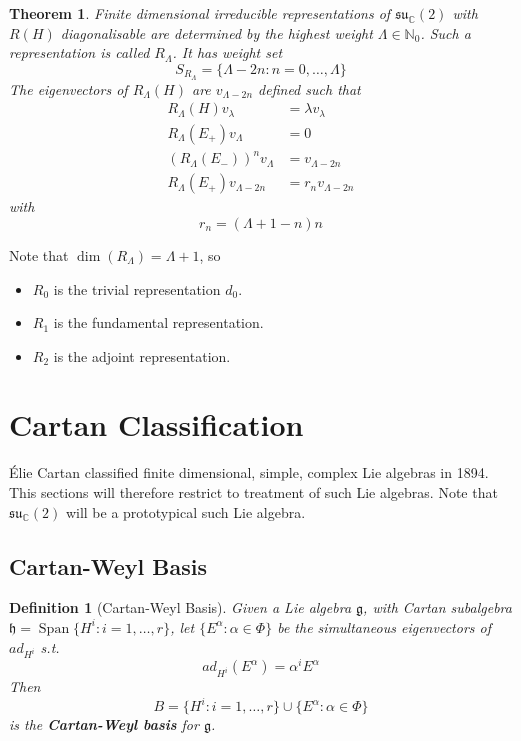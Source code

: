 \documentclass{article}
\newtheorem{theorem}{Theorem}[subsection]
\newtheorem{definition}{Definition}[subsection]
\DeclareMathOperator{\spn}{Span}
\newcommand{\bam}[1]{\textbf{#1}}
\newcommand{\mf}[1]{\mathfrak{#1}}
\newcommand{\mbb}[1]{\mathbb{#1}}
\begin{document}
\begin{theorem}
Finite dimensional irreducible representations of $\mf{su}_\mbb{C}(2)$ with $R(H)$ diagonalisable are determined by the highest weight $\Lambda\in\mbb{N}_0$. Such a representation is called $R_\Lambda$. It has weight set 
\[
S_{R_\Lambda}=\lbrace \Lambda-2n : n=0,\dots,\Lambda \rbrace
\]
The eigenvectors of $R_\Lambda(H)$ are $v_{\Lambda-2n}$ defined such that 
\begin{align*}
R_\Lambda(H) v_\lambda &= \lambda v_\lambda \\
R_\Lambda(E_+) v_\Lambda &= 0 \\
 \left(R_\Lambda(E_-)\right)^n v_{\Lambda} &= v_{\Lambda-2n} \\
 R_\Lambda(E_+) v_{\Lambda-2n} &= r_n v_{\Lambda-2n}
\end{align*}
with 
\[
r_n=(\Lambda+1-n)n
\]
\end{theorem}
Note that $\dim(R_\Lambda)=\Lambda+1$, so 
\begin{itemize}
    \item $R_0$ is the trivial representation $d_0$.
    \item $R_1$ is the fundamental representation.
    \item $R_2$ is the adjoint representation. 
\end{itemize}
\section{Cartan Classification}
\'Elie Cartan classified finite dimensional, simple, complex Lie algebras in 1894. This sections will therefore restrict to treatment of such Lie algebras. Note that $\mf{su}_\mbb{C}(2)$ will be a prototypical such Lie algebra. 

\subsection{Cartan-Weyl Basis}

\begin{definition}[Cartan-Weyl Basis]
Given a Lie algebra $\mf{g}$, with Cartan subalgebra $\mf{h}=\spn\lbrace H^i : i=1,\dots,r\rbrace$, let $\lbrace E^\alpha : \alpha\in\Phi \rbrace$ be the simultaneous eigenvectors of $ad_{H^i}$ s.t. 
\[
ad_{H^i}\left(E^\alpha \right)=\alpha^i E^\alpha
\]
Then 
\[
B=\lbrace H^i : i=1,\dots,r\rbrace \cup \lbrace E^\alpha : \alpha\in\Phi \rbrace
\]
is the \bam{Cartan-Weyl basis} for $\mf{g}$.
\end{definition}
\end{document}
